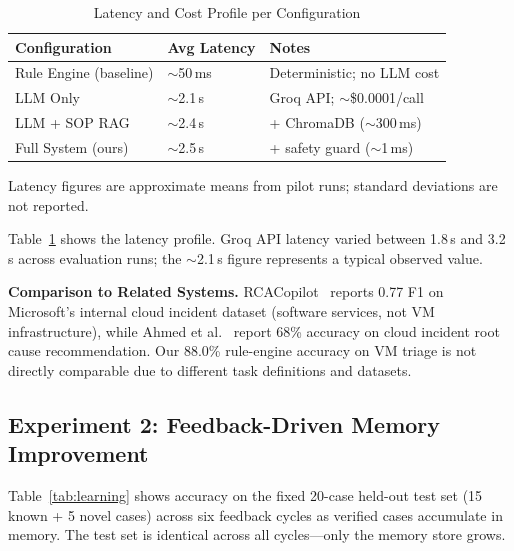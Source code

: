 \documentclass[a4paper,10pt,journal,compsoc]{IEEEtran}
\begin{document}
\begin{table}[t]
  \caption{Latency and Cost Profile per Configuration}
  \label{tab:latency}
  \centering
  \begin{tabular}{lll}
    \toprule
    \textbf{Configuration} & \textbf{Avg Latency} & \textbf{Notes} \\
    \midrule
    Rule Engine (baseline) & $\sim$50\,ms  & Deterministic; no LLM cost \\
    LLM Only               & $\sim$2.1\,s  & Groq API; $\sim$\$0.0001/call \\
    LLM + SOP RAG          & $\sim$2.4\,s  & + ChromaDB ($\sim$300\,ms) \\
    Full System (ours)     & $\sim$2.5\,s  & + safety guard ($\sim$1\,ms) \\
    \bottomrule
  \end{tabular}
  \smallskip

  {\footnotesize Latency figures are approximate means from pilot runs;
  standard deviations are not reported.}
\end{table}

Table~\ref{tab:latency} shows the latency profile. Groq API latency
varied between 1.8\,s and 3.2\,s across evaluation runs; the
$\sim$2.1\,s figure represents a typical observed value.

\textbf{Comparison to Related Systems.}
RCACopilot~\cite{chen2024rcacopilot} reports 0.77 F1 on Microsoft's
internal cloud incident dataset (software services, not VM
infrastructure), while Ahmed et al.~\cite{ahmed2023rootcause} report
68\% accuracy on cloud incident root cause recommendation. Our 88.0\%
rule-engine accuracy on VM triage is not directly comparable due to
different task definitions and datasets.

\subsection{Experiment 2: Feedback-Driven Memory Improvement}
\label{sec:exp2}

Table~\ref{tab:learning} shows accuracy on the fixed 20-case held-out
test set (15 known + 5 novel cases) across six feedback cycles as
verified cases accumulate in memory. The test set is identical across
all cycles---only the memory store grows.
\end{document}
